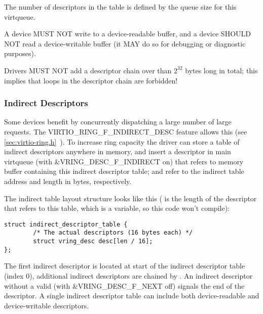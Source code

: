 The number of descriptors in the table is defined by the queue size
for this virtqueue.

A device MUST NOT write to a device-readable buffer, and a device SHOULD NOT
read a device-writable buffer (it MAY do so for debugging or diagnostic
purposes).

Drivers MUST NOT add a descriptor chain over than $2^{32}$ bytes long in total;
this implies that loops in the descriptor chain are forbidden!

\subsubsection{Indirect Descriptors}\label{sec:Basic Facilities of a Virtio Device / Virtqueues / The Virtqueue Descriptor Table / Indirect Descriptors}

Some devices benefit by concurrently dispatching a large number
of large requests. The VIRTIO_RING_F_INDIRECT_DESC feature allows this (see \ref{sec:virtio-ring.h}~). To increase
ring capacity the driver can store a table of indirect
descriptors anywhere in memory, and insert a descriptor in main
virtqueue (with \&VRING_DESC_F_INDIRECT on) that refers to memory buffer
containing this indirect descriptor table;  and 
refer to the indirect table address and length in bytes,
respectively.

The indirect table layout structure looks like this
( is the length of the descriptor that refers to this table,
which is a variable, so this code won't compile):

\begin{lstlisting}
struct indirect_descriptor_table {
        /* The actual descriptors (16 bytes each) */
        struct vring_desc desc[len / 16];
};
\end{lstlisting}

The first indirect descriptor is located at start of the indirect
descriptor table (index 0), additional indirect descriptors are
chained by . An indirect descriptor without a valid 
(with \&VRING_DESC_F_NEXT off) signals the end of the descriptor.
A single indirect descriptor
table can include both device-readable and device-writable descriptors.

